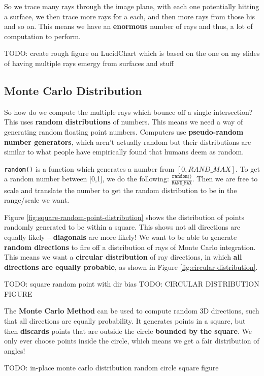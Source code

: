 \documentclass{article}
\begin{document}
So we trace many rays through the image plane, with each one potentially hitting a surface, we then trace more rays for a each, and then more rays from those his and so on. This means we have an \textbf{enormous} number of rays and thus, a lot of computation to perform.

TODO: create rough figure on LucidChart which is based on the one on my slides of having multiple rays emergy from surfaces and stuff

\subsection{Monte Carlo Distribution}

So how do we compute the multiple rays which bounce off a single intersection? This uses \textbf{random distributions} of numbers. This means we need a way of generating random floating point numbers. Computers use \textbf{pseudo-random number generators}, which aren't actually random but their distributions are similar to what people have empirically found that humans deem as random.

\texttt{random()} is a function which generates a number from $[0, RAND\_MAX]$. To get a random number between [0,1], we do the following: $\frac{\texttt{random()}}{\texttt{RAND\_MAX}}$. Then we are free to scale and translate the number to get the random distribution to be in the range/scale we want.

Figure \ref{fig:square-random-point-distribution} shows the distribution of points randomly generated to be within a square. This shows not all directions are equally likely -- \textbf{diagonals} are more likely! We want to be able to generate \textbf{random directions} to fire off a distribution of rays of Monte Carlo integration. This means we want a \textbf{circular distribution} of ray directions, in which \textbf{all directions are equally probable}, as shown in Figure \ref{fig:circular-distribution}.

TODO: square random point with dir bias
TODO: CIRCULAR DISTRIBUTION FIGURE

The \textbf{Monte Carlo Method} can be used to compute random 3D directions, such that all directions are equally probability. It generates points in a square, but then \textbf{discards} points that are outside the circle \textbf{bounded by the square}. We only ever choose points inside the circle, which means we get a fair distribution of angles! 

TODO: in-place monte carlo distribution random circle square figure
\end{document}
